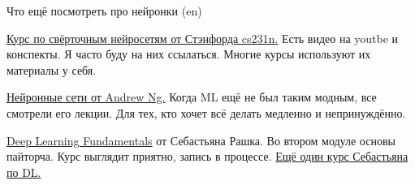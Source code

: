 \documentclass[notes,12pt, aspectratio=169]{beamer}
\newenvironment{wideitemize}{\itemize\addtolength{\itemsep}{10pt}}{\enditemize}
\begin{document}
\begin{frame}{Что ещё посмотреть  про нейронки (en)}
\begin{wideitemize} 		
	\item  \href{https://www.youtube.com/watch?v=vT1JzLTH4G4&list=PLSVEhWrZWDHQTBmWZufjxpw3s8sveJtnJ}{Курс по свёрточным нейросетям от Стэнфорда cs231n.}  Есть видео на youtbe и конспекты. Я часто буду на них ссылаться.  Многие курсы используют их материалы у себя. 
	
	\item  \href{https://www.coursera.org/specializations/deep-learning} {Нейронные сети от Andrew Ng.} Когда ML ещё не был таким модным, все смотрели его лекции. \alert{Для тех, кто хочет всё делать медленно и непринуждённо.}
	
	\item \href{https://lightning.ai/pages/courses/deep-learning-fundamentals/}{Deep Learning Fundamentals}  от Себастьяна Рашка.  Во втором модуле основы пайторча. Курс выглядит приятно, запись в процессе.  \href{https://sebastianraschka.com/blog/2021/dl-course.html}{Ещё один курс Себастьяна по DL.}

\end{wideitemize} 
\end{frame} 
\end{document}
